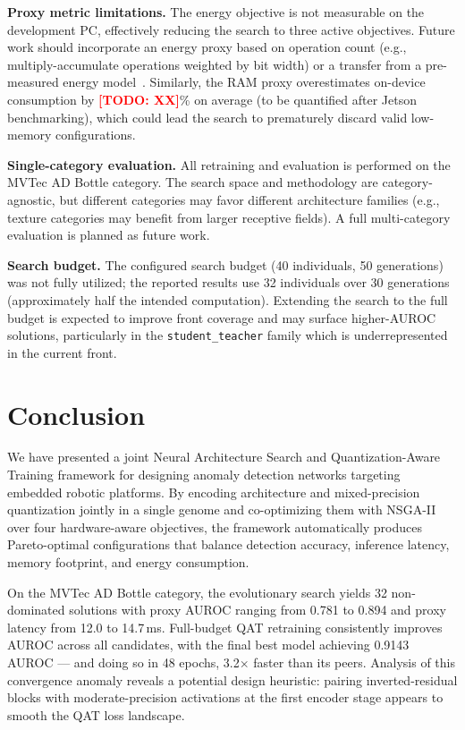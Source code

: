 \documentclass[journal]{IEEEtran}
\newcommand{\TODO}[1]{\textcolor{red}{\textbf{[TODO: #1]}}}
\begin{document}
\textbf{Proxy metric limitations.}
The energy objective is not measurable on the development PC, effectively
reducing the search to three active objectives.
Future work should incorporate an energy proxy based on operation count
(e.g., multiply-accumulate operations weighted by bit width) or a transfer
from a pre-measured energy model~\cite{chen2019net2vec}.
Similarly, the RAM proxy overestimates on-device consumption by 
\TODO{XX}\% on average (to be quantified after Jetson benchmarking),
which could lead the search to prematurely discard valid low-memory
configurations.

\textbf{Single-category evaluation.}
All retraining and evaluation is performed on the MVTec AD Bottle category.
The search space and methodology are category-agnostic, but different
categories may favor different architecture families (e.g., texture categories
may benefit from larger receptive fields).
A full multi-category evaluation is planned as future work.

\textbf{Search budget.}
The configured search budget (40 individuals, 50 generations) was not fully
utilized; the reported results use 32 individuals over 30 generations
(approximately half the intended computation).
Extending the search to the full budget is expected to improve front coverage
and may surface higher-AUROC solutions, particularly in the
\texttt{student\_teacher} family which is underrepresented in the current front.

\section{Conclusion}
\label{sec:conclusion}

We have presented a joint Neural Architecture Search and Quantization-Aware
Training framework for designing anomaly detection networks targeting
embedded robotic platforms.
By encoding architecture and mixed-precision quantization jointly in a single
genome and co-optimizing them with NSGA-II over four hardware-aware objectives,
the framework automatically produces Pareto-optimal configurations that balance
detection accuracy, inference latency, memory footprint, and energy consumption.

On the MVTec AD Bottle category, the evolutionary search yields 32 non-dominated
solutions with proxy AUROC ranging from 0.781 to 0.894 and proxy latency from
12.0 to 14.7\,ms.
Full-budget QAT retraining consistently improves AUROC across all candidates,
with the final best model achieving 0.9143 AUROC — and doing so in 48 epochs,
3.2$\times$ faster than its peers.
Analysis of this convergence anomaly reveals a potential design heuristic:
pairing inverted-residual blocks with moderate-precision activations at the
first encoder stage appears to smooth the QAT loss landscape.
\end{document}
